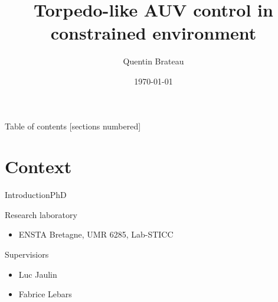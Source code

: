 \documentclass[10pt, xcolor={usenames, dvipsnames}]{beamer}
\title{Torpedo-like AUV control in constrained environment}
\date{\today}
\author{Quentin Brateau}
\institute{ENSTA Bretagne}
\begin{document}
    \maketitle

    \begin{frame}{Table of contents}
        [sections numbered]
        \tableofcontents[hideallsubsections]
    \end{frame}

    \section{Context}

        \begin{frame}{Introduction}{PhD}
            \centering
            \begin{minipage}[c]{0.58\textwidth}
                \begin{block}{Research laboratory}
                    \vspace{0.2cm}
                    \begin{itemize}
                        \item ENSTA Bretagne, UMR 6285, Lab-STICC
                    \end{itemize}
                \end{block}

                \begin{block}{Supervisiors}
                    \begin{itemize}
                        \item Luc Jaulin
                        \item Fabrice Lebars
                    \end{itemize}
                \end{block}


\end{minipage}
\end{frame}
\end{document}
